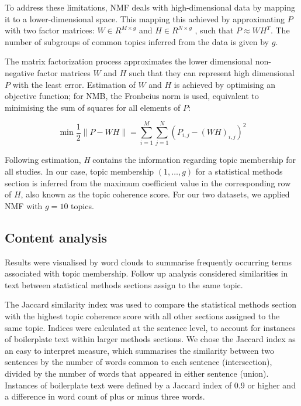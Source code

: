 \documentclass[12pt]{article}
\begin{document}
To address these limitations, NMF deals with high-dimensional data by
mapping it to a lower-dimensional space. This mapping this achieved by
approximating \(P\) with two factor matrices: \(W \in R^{M \times g}\)
and \(H \in R ^{N \times g}\) \citep{aggarwal2012mining}, such that
\(P \approx WH^{T}\). The number of subgroups of common topics inferred
from the data is given by \(g\).

The matrix factorization process approximates the lower dimensional
non-negative factor matrices \(W\) and \(H\) such that they can
represent high dimensional \(P\) with the least error. Estimation of
\(W\) and \(H\) is achieved by optimising an objective function; for
NMB, the Fronbeius norm is used, equivalent to minimising the sum of
squares for all elements of \(P\):

\begin{equation}
\label{eq:NMFobjectivefn}
\min \frac{1}{2}\|P - WH\|= \sum _{i=1}^{M}\sum _{j=1}^{N} \left(  P_{i,j} -\left(WH \right)_{i,j} \right)^{2}
\end{equation}

Following estimation, \textit{H} contains the information regarding
topic membership for all studies. In our case, topic membership
\((1,\ldots,g)\) for a statistical methods section is inferred from the
maximum coefficient value in the corresponding row of \(H\), also known
as the topic coherence score. For our two datasets, we applied NMF with
\(g=10\) topics.

\subsection{Content analysis}

Results were visualised by word clouds to summarise
frequently occurring terms associated with topic membership. Follow up analysis considered 
similarities in text between statistical methods sections assign to the same topic.

The Jaccard similarity index was used to compare the statistical methods
section with the highest topic coherence score with all other sections
assigned to the same topic. Indices were calculated at the sentence
level, to account for instances of boilerplate text within larger
methods sections. We chose the Jaccard index as an easy to interpret
measure, which summarises the similarity between two sentences by the
number of words common to each sentence (intersection), divided by the
number of words that appeared in either sentence (union). Instances of
boilerplate text were defined by a Jaccard index of 0.9 or higher and a
difference in word count of plus or minus three words.
\end{document}
